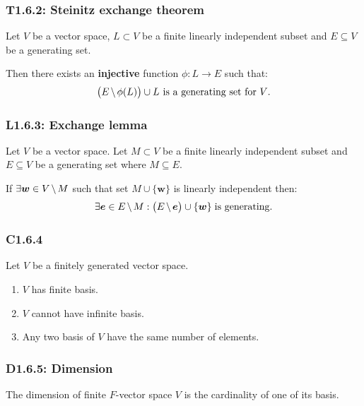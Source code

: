 \documentclass{article}
\newcommand{\vc}[1]{\boldsymbol{#1}}
\begin{document}
\begin{multicols*}{3}
\subsubsection*{T1.6.2: Steinitz exchange theorem}
Let $V$ be a vector space, $L\subset V$ be a finite
linearly independent subset and $E\subseteq V$
be a generating set.

Then there exists an \textbf{injective} function
$\phi:L\rightarrow E$ such that:
$$\bigl(E\hspace{0.02in}\backslash\hspace{0.02in}
\phi(L)\bigr)\cup L
\hspace{0.05in}\text{is a generating set for $V$.}$$

\subsubsection*{L1.6.3: Exchange lemma}
Let $V$ be a vector space. Let $M\subset V$ be a finite
linearly independent subset and $E\subseteq V$
be a generating set where $M\subseteq E$.

If $\exists\vc{w}\in V\hspace{0.02in}\backslash\hspace{0.02in} M$
such that set $M\cup\{\vc{w}\}$ is linearly independent then:
$$\exists\vc{e}\in E\hspace{0.02in}\backslash\hspace{0.02in} M:
\bigl(E\hspace{0.02in}\backslash\hspace{0.02in}
\vc{e}\bigr)\cup\{\vc{w}\}\hspace{0.04in}\text{is generating.}$$

\subsubsection*{C1.6.4}
Let $V$ be a finitely generated vector space.
\begin{enumerate}
    \item $V$ has finite basis.
    
    \item $V$ cannot have infinite basis.
    
    \item Any two basis of $V$ have the
    same number of elements.
\end{enumerate}

\subsubsection*{D1.6.5: Dimension}
The dimension of finite $F$-vector space $V$ is the
cardinality of one of its basis. 


\end{multicols*}
\end{document}
